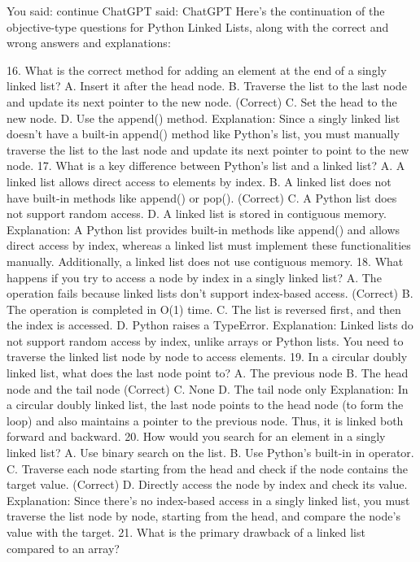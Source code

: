 You said:
continue
ChatGPT said:
ChatGPT
Here’s the continuation of the objective-type questions for Python Linked Lists, along with the correct and wrong answers and explanations:

16. What is the correct method for adding an element at the end of a singly linked list?
A. Insert it after the head node.
B. Traverse the list to the last node and update its next pointer to the new node. (Correct)
C. Set the head to the new node.
D. Use the append() method.
Explanation: Since a singly linked list doesn't have a built-in append() method like Python's list, you must manually traverse the list to the last node and update its next pointer to point to the new node.
17. What is a key difference between Python’s list and a linked list?
A. A linked list allows direct access to elements by index.
B. A linked list does not have built-in methods like append() or pop(). (Correct)
C. A Python list does not support random access.
D. A linked list is stored in contiguous memory.
Explanation: A Python list provides built-in methods like append() and allows direct access by index, whereas a linked list must implement these functionalities manually. Additionally, a linked list does not use contiguous memory.
18. What happens if you try to access a node by index in a singly linked list?
A. The operation fails because linked lists don't support index-based access. (Correct)
B. The operation is completed in O(1) time.
C. The list is reversed first, and then the index is accessed.
D. Python raises a TypeError.
Explanation: Linked lists do not support random access by index, unlike arrays or Python lists. You need to traverse the linked list node by node to access elements.
19. In a circular doubly linked list, what does the last node point to?
A. The previous node
B. The head node and the tail node (Correct)
C. None
D. The tail node only
Explanation: In a circular doubly linked list, the last node points to the head node (to form the loop) and also maintains a pointer to the previous node. Thus, it is linked both forward and backward.
20. How would you search for an element in a singly linked list?
A. Use binary search on the list.
B. Use Python's built-in in operator.
C. Traverse each node starting from the head and check if the node contains the target value. (Correct)
D. Directly access the node by index and check its value.
Explanation: Since there’s no index-based access in a singly linked list, you must traverse the list node by node, starting from the head, and compare the node's value with the target.
21. What is the primary drawback of a linked list compared to an array?
